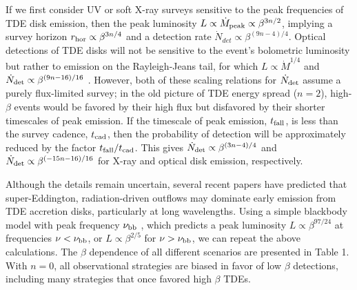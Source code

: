 \documentclass[useAMS, twocolumn, usenatbib]{mn2e}
\begin{document}
If we first consider UV or soft X-ray surveys sensitive to the peak frequencies of TDE disk emission, then the peak luminosity $L \propto \dot{M}_{\rm peak} \propto \beta^{3n/2}$, implying a survey horizon $r_{\rm hor} \propto \beta^{3n/4}$ and a detection rate $\dot{N}_{det} \propto \beta^{(9n-4)/4}$.  Optical detections of TDE disks will not be sensitive to the event's bolometric luminosity but rather to emission on the Rayleigh-Jeans tail, for which $L \propto \dot{M}^{1/4}$ and $\dot{N}_{\rm det} \propto \beta^{(9n-16)/16}$ \citep{LodatoRossi11}.  However, both of these scaling relations for $\dot{N}_{\rm det}$ assume a purely flux-limited survey; in the old picture of TDE energy spread ($n=2$), high-$\beta$ events would be favored by their high flux but disfavored by their shorter timescales of peak emission.  If the timescale of peak emission, $t_{\rm fall}$, is less than the survey cadence, $t_{\rm cad}$, then the probability of detection will be approximately reduced by the factor $t_{\rm fall}/t_{\rm cad}$.  This gives $\dot{N}_{\rm det}\propto \beta^{(3n-4)/4}$ and $\dot{N}_{\rm det} \propto \beta^{(-15n-16)/16}$ for X-ray and optical disk emission, respectively.

Although the details remain uncertain, several recent papers \citep{StrubbeQuataert09, LodatoRossi11} have predicted that super-Eddington, radiation-driven outflows may dominate early emission from TDE accretion disks, particularly at long wavelengths.  Using a simple blackbody model with peak frequency $\nu_{\rm bb}$ \citep{LodatoRossi11}, which predicts a peak luminosity $L \propto \beta^{97/24}$ at frequencies $\nu<\nu_{\rm bb}$, or $L\propto \beta^{2/5}$ for $\nu> \nu_{\rm bb}$, we can repeat the above calculations.  The $\beta$ dependence of all different scenarios are presented in Table 1.  With $n=0$, all observational strategies are biased in favor of low $\beta$ detections, including many strategies that once favored high $\beta$ TDEs.
\end{document}
